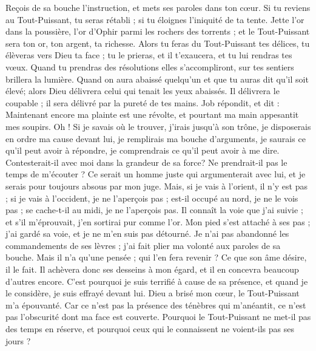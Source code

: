 \begin{multicols}{2}
Reçois de sa bouche l'instruction, et mets ses paroles dans ton cœur.
Si tu reviens au Tout-Puissant, tu seras rétabli ; si tu éloignes l'iniquité de ta tente.
Jette l'or dans la poussière, l'or d'Ophir parmi les rochers des torrents ;
et le Tout-Puissant sera ton or, ton argent, ta richesse.
Alors tu feras du Tout-Puissant tes délices, tu élèveras vers Dieu ta face ;
tu le prieras, et il t'exaucera, et tu lui rendras tes vœux.
Quand tu prendras des résolutions elles s'accompliront, sur tes sentiers brillera la lumière.
Quand on aura abaissé quelqu'un et que tu auras dit qu'il soit élevé; alors Dieu délivrera celui qui tenait les yeux abaissés.
Il délivrera le coupable ; il sera délivré par la pureté de tes mains.
\VerseOne{}Job répondit, et dit :
Maintenant encore ma plainte est une révolte, et pourtant ma main appesantit mes soupirs.
Oh ! Si je savais où le trouver, j'irais jusqu'à son trône,
je disposerais en ordre ma cause devant lui, je remplirais ma bouche d'arguments,
je saurais ce qu'il peut avoir à répondre, je comprendrais ce qu'il peut avoir à me dire.
Contesterait-il avec moi dans la grandeur de sa force? Ne prendrait-il pas le temps de m'écouter ?
Ce serait un homme juste qui argumenterait avec lui, et je serais pour toujours absous par mon juge.
Mais, si je vais à l'orient, il n'y est pas ; si je vais à l'occident, je ne l'aperçois pas ;
est-il occupé au nord, je ne le vois pas ; se cache-t-il au midi, je ne l'aperçois pas.
Il connaît la voie que j'ai suivie ; et s'il m'éprouvait, j'en sortirai pur comme l'or.
Mon pied s'est attaché à ses pas ; j'ai gardé sa voie, et je ne m'en suis pas détourné.
Je n'ai pas abandonné les commandements de ses lèvres ; j'ai fait plier ma volonté aux paroles de sa bouche.
Mais il n'a qu'une pensée ; qui l'en fera revenir ? Ce que son âme désire, il le fait.
Il achèvera donc ses desseins à mon égard, et il en concevra beaucoup d'autres encore.
C'est pourquoi je suis terrifié à cause de sa présence, et quand je le considère, je suis effrayé devant lui.
Dieu a brisé mon cœur, le Tout-Puissant m'a épouvanté.
Car ce n'est pas la présence des ténèbres qui m'anéantit, ce n'est pas l'obscurité dont ma face est couverte.
\VerseOne{}Pourquoi le Tout-Puissant ne met-il pas des temps en réserve, et pourquoi ceux qui le connaissent ne voient-ils pas ses jours ?

\end{multicols}
